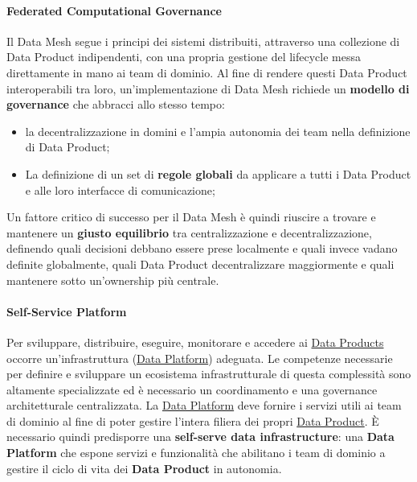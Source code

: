 \paragraph{Federated Computational Governance}\label{par:db_federated_computational_governance} %
Il Data Mesh segue i principi dei sistemi distribuiti, attraverso una collezione di Data Product indipendenti, con una propria gestione  del lifecycle messa direttamente in mano ai team di dominio.
Al fine di rendere questi Data Product interoperabili tra loro, un'implementazione di Data Mesh richiede un \textbf{modello di governance} che abbracci allo stesso tempo:
\begin{itemize}
    \item la decentralizzazione in domini e l'ampia autonomia dei team nella definizione di Data Product;
    \item La definizione di un set di \textbf{regole globali} da applicare a tutti i Data Product e alle loro interfacce di comunicazione;
\end{itemize}
Un fattore critico di successo per il Data Mesh è quindi riuscire a trovare e mantenere un \textbf{giusto equilibrio} tra centralizzazione e decentralizzazione, definendo quali decisioni debbano essere prese localmente e quali invece vadano definite globalmente, quali Data Product decentralizzare maggiormente e quali mantenere sotto un'ownership più centrale.
%
\paragraph{Self-Service Platform}\label{par:db_self_service_platform} %
Per sviluppare, distribuire, eseguire, monitorare e accedere ai \hyperref[par:db_data_as_a_product]{Data Products} occorre un'infrastruttura (\hyperref[sub:db_limiti_delle_data_platform]{Data Platform}) adeguata.
Le competenze necessarie per definire e sviluppare un ecosistema infrastrutturale di questa complessità sono altamente specializzate ed è necessario un coordinamento e una governance architetturale centralizzata.
\emptyln{}
La \hyperref[sub:db_limiti_delle_data_platform]{Data Platform} deve fornire i servizi utili ai team di dominio al fine di poter gestire l'intera filiera dei propri \hyperref[par:db_data_as_a_product]{Data Product}.
È necessario quindi predisporre una \textbf{self-serve data infrastructure}: una \textbf{Data Platform} che espone servizi e funzionalità che abilitano i team di dominio a gestire il ciclo di vita dei \textbf{Data Product} in autonomia.
%
